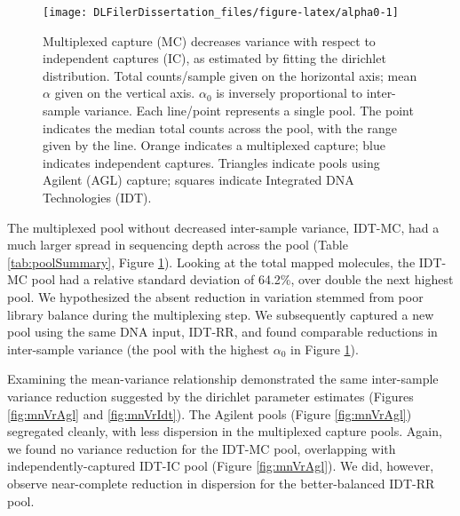 \documentclass[11pt,letterpaper,oneside]{book}
\begin{document}
\begin{figure}

{\centering \texttt{[image: DLFilerDissertation\_files/figure-latex/alpha0-1]} 

}

\caption[Multiplexed capture decreases variance with respect to independent captures, as estimated by fitting the dirichlet distribution.]{Multiplexed capture (MC) decreases variance with respect to independent captures (IC), as estimated by fitting the dirichlet distribution. Total counts/sample given on the horizontal axis; mean \(\alpha\) given on the vertical axis. \(\alpha_0\) is inversely proportional to inter-sample variance. Each line/point represents a single pool. The point indicates the median total counts across the pool, with the range given by the line. Orange indicates a multiplexed capture; blue indicates independent captures. Triangles indicate pools using Agilent (AGL) capture; squares indicate Integrated DNA Technologies (IDT).}\label{fig:alpha0}
\end{figure}

The multiplexed pool without decreased inter-sample variance, IDT-MC, had a much larger spread in sequencing depth across the pool (Table \ref{tab:poolSummary}, Figure \ref{fig:alpha0}).
Looking at the total mapped molecules, the IDT-MC pool had a relative standard deviation of 64.2\%, over double the next highest pool.
We hypothesized the absent reduction in variation stemmed from poor library balance during the multiplexing step.
We subsequently captured a new pool using the same DNA input, IDT-RR, and found comparable reductions in inter-sample variance (the pool with the highest \(\alpha_0\) in Figure \ref{fig:alpha0}).

Examining the mean-variance relationship demonstrated the same inter-sample variance reduction suggested by the dirichlet parameter estimates (Figures \ref{fig:mnVrAgl} and \ref{fig:mnVrIdt}).
The Agilent pools (Figure \ref{fig:mnVrAgl}) segregated cleanly, with less dispersion in the multiplexed capture pools.
Again, we found no variance reduction for the IDT-MC pool, overlapping with independently-captured IDT-IC pool (Figure \ref{fig:mnVrAgl}).
We did, however, observe near-complete reduction in dispersion for the better-balanced IDT-RR pool.
\end{document}
